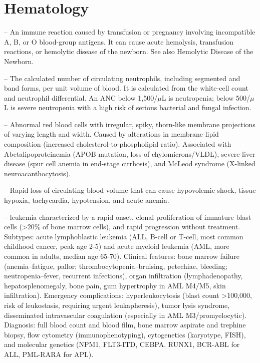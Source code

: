 \chapter{Hematology}

-- An immune reaction caused by transfusion or pregnancy involving incompatible A, B, or O blood-group antigens. It can cause acute hemolysis, transfusion reactions, or hemolytic disease of the newborn. See also Hemolytic Disease of the Newborn.

-- The calculated number of circulating neutrophils, including segmented and band forms, per unit volume of blood. It is calculated from the white-cell count and neutrophil differential. An ANC below 1,500/\(\mu\)L is neutropenia; below 500/\(\mu\)L is severe neutropenia with a high risk of serious bacterial and fungal infection.

-- Abnormal red blood cells with irregular, spiky, thorn-like membrane projections of varying length and width. Caused by alterations in membrane lipid composition (increased cholesterol-to-phospholipid ratio). Associated with Abetalipoproteinemia (APOB mutation, loss of chylomicrons/VLDL), severe liver disease (spur cell anemia in end-stage cirrhosis), and McLeod syndrome (X-linked neuroacanthocytosis).

-- Rapid loss of circulating blood volume that can cause hypovolemic shock, tissue hypoxia, tachycardia, hypotension, and acute anemia.

-- leukemia characterized by a rapid onset, clonal proliferation of immature blast cells (>20\% of bone marrow cells), and rapid progression without treatment. Subtypes: acute lymphoblastic leukemia (ALL, B-cell or T-cell, most common childhood cancer, peak age 2-5) and acute myeloid leukemia (AML, more common in adults, median age 65-70). Clinical features: bone marrow failure (anemia--fatigue, pallor; thrombocytopenia--bruising, petechiae, bleeding; neutropenia--fever, recurrent infections), organ infiltration (lymphadenopathy, hepatosplenomegaly, bone pain, gum hypertrophy in AML M4/M5, skin infiltration). Emergency complications: hyperleukocytosis (blast count >100,000, risk of leukostasis, requiring urgent leukapheresis), tumor lysis syndrome, disseminated intravascular coagulation (especially in AML M3/promyelocytic). Diagnosis: full blood count and blood film, bone marrow aspirate and trephine biopsy, flow cytometry (immunophenotyping), cytogenetics (karyotype, FISH), and molecular genetics (NPM1, FLT3-ITD, CEBPA, RUNX1, BCR-ABL for ALL, PML-RARA for APL).

